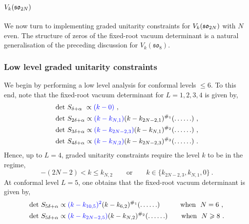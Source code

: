 \subsection{$V_k(\mathfrak{so}_{2N})$}
We now turn to implementing graded unitarity constraints for $V_k(\mathfrak{so}_{2N})$ with $N$ even. The structure of zeros of the fixed-root vacuum determinant is a natural generalisation of the preceding discussion for $V_k(\mathfrak{so}_8)$.

\subsubsection{Low level graded unitarity constraints}
We begin by performing a low level analysis for conformal levels $ \leqslant 6$. To this end, note that the fixed-root vacuum determinant for $L = 1,2,3,4$ is given by,
\begin{equation} \label{eq: so2NevenL1to3}
\begin{split}
    &\text{det}~S_{\delta + \alpha} \ \propto \textcolor{blue}{(k - 0)}~, \\
    &\text{det}~S_{2\delta + \alpha} \propto \textcolor{blue}{(k - k_{N,1})}(k-k_{2N-2,1})^{\#_1} (\ldots \ldots)~,\\ 
    &\text{det}~S_{3\delta + \alpha} \propto \textcolor{blue}{(k - k_{2N-2,3})}(k-k_{N,1})^{\#_2} (\ldots \ldots)~,\\
    &\text{det}~S_{4\delta + \alpha} \propto \textcolor{blue}{(k - k_{N,2})}(k-k_{2N-2,3})^{\#_3} (\ldots \ldots)~.\\
\end{split}   
\end{equation}
Hence, up to $L = 4$, graded unitarity constraints require the level $k$ to be in the regime,
\begin{equation}
    -(2N-2) < k \leqslant k_{N,2} \qquad \text{or} \qquad k \in \{k_{2N-2,3}, k_{N,1}, 0\}~. 
\end{equation}
At conformal level $L = 5$, one obtains that the fixed-root vacuum determinant is given by,
\begin{equation} \label{eq:level5Dtypeeven}
\begin{split}
    &\text{det}~S_{5\delta + \alpha} \propto \textcolor{blue}{(k - k_{10,5})^2}(k-k_{6,2})^{\#_1} (\ldots \ldots) \qquad \ \ \ \text{when} \ \ N = 6~, \\
    &\text{det}~S_{5\delta + \alpha} \propto \textcolor{blue}{(k - k_{2N-2,5})}(k-k_{N,2})^{\#_2} (\ldots \ldots) \qquad \text{when} \ \ N \geqslant 8~.   
\end{split}
\end{equation}
